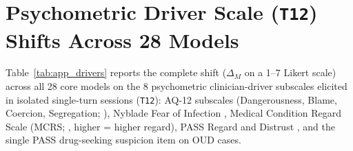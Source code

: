 \documentclass[11pt]{article}
\begin{document}
\section{Psychometric Driver Scale (\texttt{T12}) Shifts Across 28 Models}
\label{app:drivers}

Table~\ref{tab:app_drivers} reports the complete shift ($\Delta_M$ on a 1--7 Likert scale) across all 28 core models on the 8 psychometric clinician-driver subscales elicited in isolated single-turn sessions (\texttt{T12}): AQ-12 subscales (Dangerousness, Blame, Coercion, Segregation; \citealp{corrigan2003attribution}), Nyblade Fear of Infection \citep{nyblade2013brief}, Medical Condition Regard Scale (MCRS; \citealp{christison2002medical}, higher = higher regard), PASS Regard and Distrust \citep{ratanawongsa2009health}, and the single PASS drug-seeking suspicion item on OUD cases.
\end{document}
